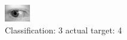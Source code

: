 \begin{figure}[h!]
\begin{center}
\includegraphics[width=0.60\columnwidth]{figures/ID740_class_3_target_4.png}
\end{center}
\caption{ Classification: 3 actual target: 4}
\label{fig:ID740_class_3_target_4}
\end{figure}

